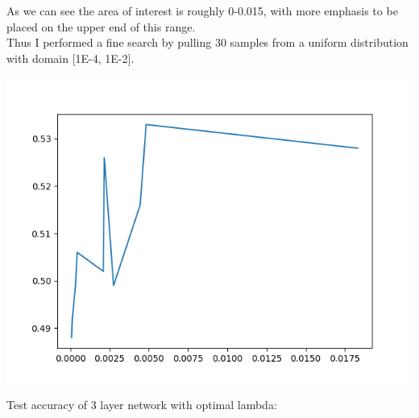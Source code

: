 \documentclass[11pt,a4paper]{article}
\begin{document}
As we can see the area of interest is roughly 0-0.015, with more emphasis to be placed on the upper end of this range.\\

Thus I performed a fine search by pulling 30 samples from a uniform distribution with domain [1E-4, 1E-2].


\includegraphics[width=\textwidth]{fine_search.png}


Test accuracy of 3 layer network with optimal lambda:
\end{document}
